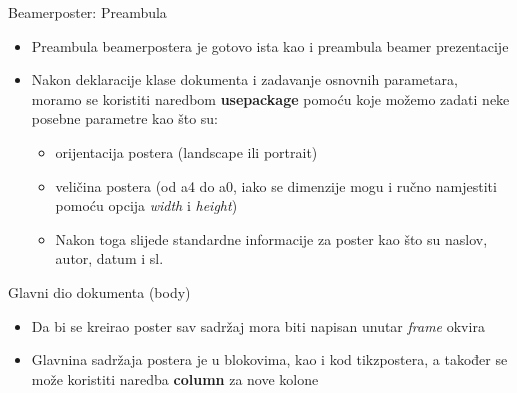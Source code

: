 \documentclass{beamer}
\begin{document}
\begin{frame}{Beamerposter: Preambula}

\begin{itemize}
    \item Preambula beamerpostera je gotovo ista kao i preambula beamer prezentacije
    \item Nakon deklaracije klase dokumenta i zadavanje osnovnih parametara, moramo se koristiti naredbom \textbf{usepackage} pomoću koje možemo zadati neke posebne parametre kao što su: \begin{itemize}
        \item orijentacija postera (landscape ili portrait)
        \item veličina postera (od a4 do a0, iako se dimenzije mogu i ručno namjestiti pomoću opcija \textit{width} i \textit{height})
        \item Nakon toga slijede standardne informacije za poster kao što su naslov, autor, datum i sl.
    \end{itemize}
\end{itemize}


\end{frame}

\begin{frame}{Glavni dio dokumenta (body)}

\begin{itemize}
    \item Da bi se kreirao poster sav sadržaj mora biti napisan unutar \textit{frame} okvira
    \item Glavnina sadržaja postera je u blokovima, kao i kod tikzpostera, a također se može koristiti naredba \textbf{column} za nove kolone
\end{itemize}
    
\end{frame}
\end{document}
